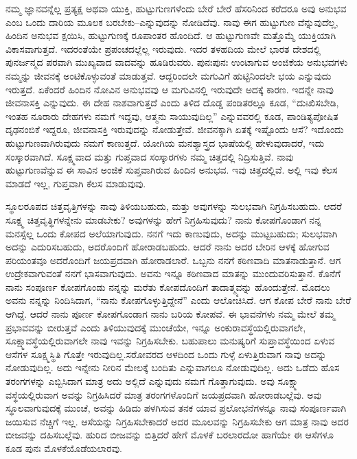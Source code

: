 ನಮ್ಮ ಜ್ಞಾನವನ್ನೆಲ್ಲ ಪ್ರತ್ಯಕ್ಷ ಅಥವಾ ಯುಕ್ತಿ, ಹುಟ್ಟುಗುಣಗಳೆಂದು ಬೇರೆ ಬೇರೆ ಹೆಸರಿನಿಂದ ಕರೆದರೂ ಅವು ಅನುಭವ ಎಂಬ ಒಂದು ದಾರಿಯ ಮೂಲಕ ಬರಬೇಕು–ಎನ್ನುವುದನ್ನು ನೋಡಿದೆವು. ನಾವು ಈಗ ಹುಟ್ಟುಗುಣ ವೆನ್ನುವುದೆಲ್ಲ, ಹಿಂದಿನ ಅನುಭವ ಕ್ಷಯಿಸಿ, ಹುಟ್ಟುಗುಣಕ್ಕೆ ರೂಪಾಂತರ ಹೊಂದಿದೆ. ಆ ಹುಟ್ಟುಗುಣವೇ ಮತ್ತೊಮ್ಮೆ ಯುಕ್ತಿಯಾಗಿ ವಿಕಾಸವಾಗುತ್ತದೆ. ಇದರಂತೆಯೇ ಪ್ರಪಂಚದಲ್ಲೆಲ್ಲ ಇರುವುದು. ಇದರ ತಳಹದಿಯ ಮೇಲೆ ಭಾರತ ದೇಶದಲ್ಲಿ ಪುನರ್ಜನ್ಮದ ಪರವಾಗಿ ಮುಖ್ಯವಾದ ವಾದವನ್ನು ಹೂಡಿರುವರು. ಪುನಃಪುನಃ ಉಂಟಾಗುವ ಅಂಜಿಕೆಯ ಅನುಭವಗಳು ನಮ್ಮನ್ನು ಜೀವನಕ್ಕೆ ಅಂಟಿಕೊಳ್ಳುವಂತೆ ಮಾಡುತ್ತವೆ. ಆದ್ದರಿಂದಲೇ ಮಗುವಿಗೆ ಹುಟ್ಟಿನಿಂದಲೇ ಭಯ ಎನ್ನುವುದು ಇರುತ್ತದೆ. ಏಕೆಂದರೆ ಹಿಂದಿನ ನೋವಿನ ಅನುಭವವು ಆ ಮಗುವಿನಲ್ಲಿ ಇರುವುದೇ ಅದಕ್ಕೆ ಕಾರಣ. ಇದನ್ನೇ ನಾವು ಜೀವನಾಸಕ್ತಿ ಎನ್ನುವುದು. ಈ ದೇಹ ನಾಶವಾಗುತ್ತದೆ ಎಂದು ತಿಳಿದ ದೊಡ್ಡ ಪಂಡಿತರಲ್ಲೂ ಕೂಡ, “ದುಃಖಿಸಬೇಡಿ, ಇಂತಹ ನೂರಾರು ದೇಹಗಳು ನಮಗೆ ಇದ್ದವು, ಆತ್ಮನು ಸಾಯುವುದಿಲ್ಲ” ಎನ್ನುವವರಲ್ಲಿ ಕೂಡ, ಪಾಂಡಿತ್ಯಪೋಷಿತ ದೃಢನಂಬಿಕೆ ಇದ್ದರೂ, ಜೀವನಾಸಕ್ತಿ ಇರುವುದನ್ನು ನೋಡುತ್ತೇವೆ. ಜೀವನಕ್ಕಾಗಿ ಏತಕ್ಕೆ ಇಷ್ಟೊಂದು ಆಸೆ? ಇದೊಂದು ಹುಟ್ಟುಗುಣವಾಗಿರುವುದು ನಮಗೆ ಕಾಣುತ್ತದೆ. ಯೋಗಿಯ ಮನಶ್ಯಾಸ್ತ್ರದ ಭಾಷೆಯಲ್ಲಿ ಹೇಳುವುದಾದರೆ, ಇದು ಸಂಸ್ಕಾರವಾಗಿದೆ. ಸೂಕ್ಷ್ಮವಾದ ಮತ್ತು ಗುಪ್ತವಾದ ಸಂಸ್ಕಾರಗಳು ನಮ್ಮ ಚಿತ್ತದಲ್ಲಿ ನಿದ್ರಿಸುತ್ತಿವೆ. ನಾವು ಹುಟ್ಟುಗುಣವೆನ್ನುವ ಈ ಸಾವಿನ ಅಂಜಿಕೆ ಸುಪ್ತವಾಗಿರುವ ಹಿಂದಿನ ಅನುಭವ. ಇವು ಚಿತ್ತದಲ್ಲಿವೆ. ಅಲ್ಲಿ ಇವು ಕೆಲಸ ಮಾಡದೆ ಇಲ್ಲ, ಗುಪ್ತವಾಗಿ ಕೆಲಸ ಮಾಡುವುವು. 

ಸ್ಥೂಲರೂಪದ ಚಿತ್ತವೃತ್ತಿಗಳನ್ನು ನಾವು ತಿಳಿಯಬಹುದು, ಮತ್ತು ಅವುಗಳನ್ನು ಸುಲಭವಾಗಿ ನಿಗ್ರಹಿಸಬಹುದು. ಆದರೆ ಸೂಕ್ಷ್ಮ ಚಿತ್ತವೃತ್ಥಿಗಳನ್ನೇನು ಮಾಡಬೇಕು? ಅವುಗಳನ್ನು ಹೇಗೆ ನಿಗ್ರಹಿಸುವುದು? ನಾನು ಕೋಪಗೊಂಡಾಗ ನನ್ನ ಮನಸ್ಸೆಲ್ಲ ಒಂದು ಕೋಪದ ಅಲೆಯಾಗುವುದು. ನನಗೆ ಇದು ಕಾಣುವುದು, ಅದನ್ನು ಮುಟ್ಟಬಹುದು; ಸುಲಭವಾಗಿ ಅದನ್ನು ಎದುರಿಸಬಹುದು, ಅದರೊಂದಿಗೆ ಹೋರಾಡಬಹುದು. ಆದರೆ ನಾನು ಅದರ ಬೇರಿನ ಆಳಕ್ಕೆ ಹೋಗುವ ಪರಿಯಂತವೂ ಅದರೊಂದಿಗೆ ಜಯಪ್ರದವಾಗಿ ಹೋರಾಡಲಾರೆ. ಒಬ್ಬನು ನನಗೆ ಕಠಿಣವಾದಿ ಮಾತನಾಡುತ್ತಾನೆ. ಆಗ ಉದ್ರೇಕವಾಗುವಂತೆ ನನಗೆ ಭಾಸವಾಗುವುದು. ಅವನು ಇನ್ನೂ ಕಠಿಣವಾದ ಮಾತನ್ನು ಮುಂದುವರಿಸುತ್ತಾನೆ. ಕೊನೆಗೆ ನಾನು ಸಂಪೂರ್ಣ ಕೋಪಗೊಂಡು ನನ್ನನ್ನು ಮರೆತು ಕೋಪದೊಂದಿಗೆ ತಾದಾತ್ಮ್ಯವನ್ನು ಹೊಂದುತ್ತೇನೆ. ಮೊದಲು ಅವನು ನನ್ನನ್ನು ನಿಂದಿಸಿದಾಗ, “ನಾನು ಕೋಪಗೊಳ್ಳುತ್ತಿದ್ದೇನೆ” ಎಂದು ಆಲೋಚಿಸಿದೆ. ಆಗ ಕೋಪ ಬೇರೆ ನಾನು ಬೇರೆ ಆಗಿದ್ದೆ. ಆದರೆ ನಾನು ಪೂರ್ಣ ಕೋಪಗೊಂಡಾಗ ನಾನು ಬರಿಯ ಕೋಪವೆ. ಈ ಭಾವನೆಗಳು ನಮ್ಮ ಮೇಲೆ ತಮ್ಮ ಪ್ರಭಾವವನ್ನು ಬೀರುತ್ತವೆ ಎಂದು ತಿಳಿಯುವುದಕ್ಕೆ ಮುಂಚೆಯೇ, ಇನ್ನೂ ಅಂಕುರಾವಸ್ಥೆಯಲ್ಲಿರುವಾಗಲೇ, ಸೂಕ್ಷ್ಮಾವಸ್ಥೆಯಲ್ಲಿರುವಾಗಲೇ ನಾವು ಇವನ್ನು ನಿಗ್ರಹಿಸಬೇಕು. ಬಹುಪಾಲು ಮನುಷ್ಯರಿಗೆ ಸುಪ್ತಾವಸ್ಥೆಯಿಂದ ಏಳುವ ಆಸೆಗಳ ಸೂಕ್ಷ್ಮಸ್ಥಿತಿ ಗೊತ್ತೇ ಇರುವುದಿಲ್ಲ.\break ಸರೋವರದ ಆಳದಿಂದ ಒಂದು ಗುಳ್ಳೆ ಏಳುತ್ತಿರುವಾಗ ನಾವು ಅದನ್ನು ನೋಡುವುದಿಲ್ಲ. ಅದು ಇನ್ನೇನು ನೀರಿನ ಮೇಲಕ್ಕೆ ಬಂದಿತು ಎನ್ನುವಾಗಲೂ ನೋಡುವುದಿಲ್ಲ. ಅದು ಒಡೆದು ಹೊಸ ತರಂಗಗಳನ್ನು ಎಬ್ಬಿಸಿದಾಗ ಮಾತ್ರ ಅದು ಅಲ್ಲಿದೆ ಎನ್ನುವುದು ನಮಗೆ ಗೊತ್ತಾಗುವುದು. ಅವು ಸೂಕ್ಷ್ಮಾ ವಸ್ಥೆಯಲ್ಲಿರುವಾಗ ಅವನ್ನು ನಿಗ್ರಹಿಸಿದರೆ ಮಾತ್ರ ತರಂಗಗಳೊಂದಿಗೆ ಜಯಪ್ರದವಾಗಿ ಹೋರಾಡಬಲ್ಲೆವು. ಅವು ಸ್ಥೂಲವಾಗುವುದಕ್ಕೆ ಮುಂಚೆ, ಅವನ್ನು ಹಿಡಿದು ಪಳಗಿಸುವ ತನಕ ಯಾವ ಪ್ರಲೋಭನೆಗಳನ್ನೂ ನಾವು ಸಂಪೂರ್ಣವಾಗಿ ಜಯಿಸುವ ನೆಚ್ಚಿಗೆ ಇಲ್ಲ. ಆಸೆಯನ್ನು ನಿಗ್ರಹಿಸಬೇಕಾದರೆ ಅದರ ಮೂಲವನ್ನು ನಿಗ್ರಹಿಸಬೇಕು ಆಗ ಮಾತ್ರ ನಾವು ಅದರ ಬೀಜವನ್ನು ದಹಿಸಬಲ್ಲೆವು. ಹುರಿದ ಬೀಜವನ್ನು ಬಿತ್ತಿದರೆ ಹೇಗೆ ಮೊಳಕೆ ಬರಲಾರದೋ ಹಾಗೆಯೇ ಈ ಆಸೆಗಳೂ ಕೂಡ ಪುನಃ ಮೊಳಕೆಯೊಡೆಯಲಾರವು. 

